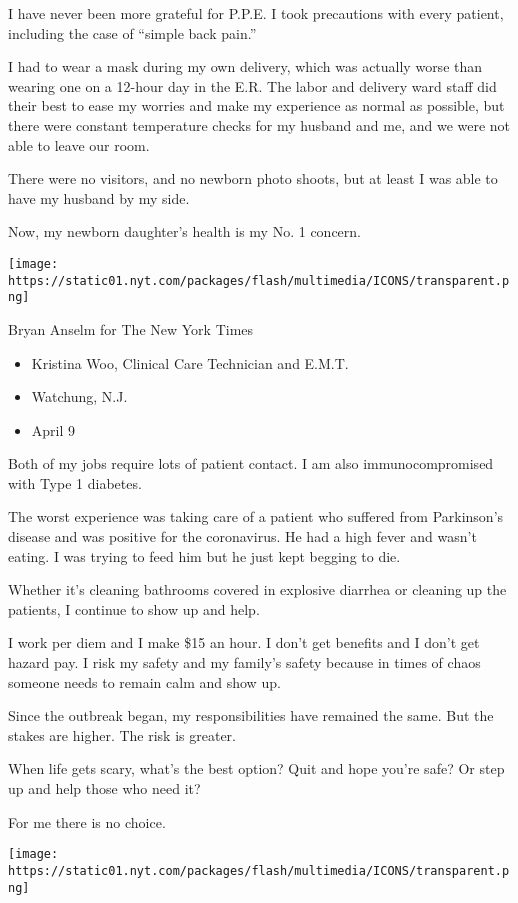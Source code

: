 I have never been more grateful for P.P.E. I took precautions with every
patient, including the case of ``simple back pain.''

I had to wear a mask during my own delivery, which was actually worse
than wearing one on a 12-hour day in the E.R. The labor and delivery
ward staff did their best to ease my worries and make my experience as
normal as possible, but there were constant temperature checks for my
husband and me, and we were not able to leave our room.

There were no visitors, and no newborn photo shoots, but at least I was
able to have my husband by my side.

Now, my newborn daughter's health is my No. 1 concern.

\texttt{[image: https://static01.nyt.com/packages/flash/multimedia/ICONS/transparent.png]}

Bryan Anselm for The New York Times

\begin{itemize}
\tightlist
\item
  Kristina Woo, Clinical Care Technician and E.M.T.
\item
  Watchung, N.J.
\item
  April 9
\end{itemize}

Both of my jobs require lots of patient contact. I am also
immunocompromised with Type 1 diabetes.

The worst experience was taking care of a patient who suffered from
Parkinson's disease and was positive for the coronavirus. He had a high
fever and wasn't eating. I was trying to feed him but he just kept
begging to die.

Whether it's cleaning bathrooms covered in explosive diarrhea or
cleaning up the patients, I continue to show up and help.

I work per diem and I make \$15 an hour. I don't get benefits and I
don't get hazard pay. I risk my safety and my family's safety because in
times of chaos someone needs to remain calm and show up.

Since the outbreak began, my responsibilities have remained the same.
But the stakes are higher. The risk is greater.

When life gets scary, what's the best option? Quit and hope you're safe?
Or step up and help those who need it?

For me there is no choice.

\texttt{[image: https://static01.nyt.com/packages/flash/multimedia/ICONS/transparent.png]}

